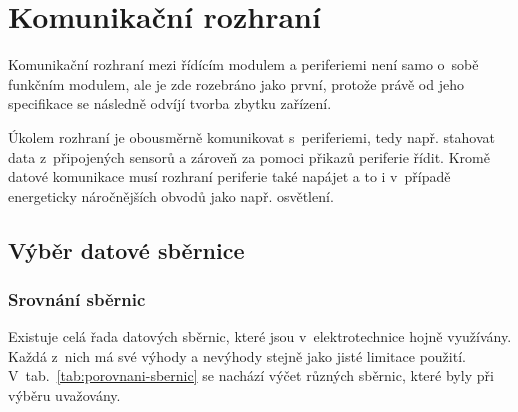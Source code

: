 \section{Komunikační rozhraní}
\label{sec:komunikacni-rozhrani}
    Komunikační rozhraní mezi řídícím modulem a periferiemi není samo o~sobě funkčním modulem, ale je zde rozebráno jako první, protože právě od jeho specifikace se následně odvíjí tvorba zbytku zařízení. 

    Úkolem rozhraní je obousměrně komunikovat s~periferiemi, tedy např. stahovat data z~připojených sensorů a zároveň za pomoci přikazů periferie řídit. Kromě datové komunikace musí rozhraní periferie také napájet a to i v~případě energeticky náročnějších obvodů jako např. osvětlení. 
    
    \subsection{Výběr datové sběrnice}
    \subsubsection{Srovnání sběrnic}
        Existuje celá řada datových sběrnic, které jsou v~elektrotechnice hojně využívány. Každá z~nich má své výhody a nevýhody stejně jako jisté limitace použití. V~tab.~\ref{tab:porovnani-sbernic} se nachází výčet různých sběrnic, které byly při výběru uvažovány. 

